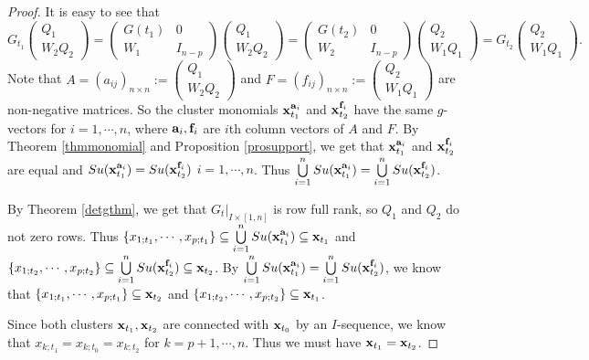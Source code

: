 \documentclass[14pt]{amsart}
\begin{document}
\begin{proof}
It is easy to see that
 $$G_{t_1}\begin{pmatrix}Q_1\\W_2 Q_2\end{pmatrix}=\begin{pmatrix}G(t_1)&0\\ W_1 &I_{n-p}\end{pmatrix} \begin{pmatrix}Q_1\\W_2 Q_2\end{pmatrix}=\begin{pmatrix}G(t_2)&0\\ W_2&I_{n-p}\end{pmatrix} \begin{pmatrix}Q_2\\W_1 Q_1\end{pmatrix} =G_{t_2}\begin{pmatrix}Q_2\\W_1 Q_1\end{pmatrix}.$$
Note that $A=(a_{ij})_{n\times n}:=\begin{pmatrix}Q_1\\W_2 Q_2\end{pmatrix}$ and $F=(f_{ij})_{n\times n}:=\begin{pmatrix}Q_2\\W_1 Q_1\end{pmatrix}$ are non-negative matrices.
So the cluster monomials ${\bf x}_{t_1}^{{\bf a}_i}$ and ${\bf x}_{t_2}^{{\bf f}_i}$ have the same $g$-vectors for $i=1,\cdots,n$, where ${\bf a}_i, {\bf f}_i$ are $i$th column vectors of $A$ and $F$. By Theorem \ref{thmmonomial} and Proposition \ref{prosupport}, we get that ${\bf x}_{t_1}^{{\bf a}_i}$ and ${\bf x}_{t_2}^{{\bf f}_i}$ are equal and $Su({\bf x}_{t_1}^{{\bf a}_i})=Su({\bf x}_{t_2}^{{\bf f}_i})$ $i=1,\cdots,n$. Thus $\bigcup\limits_{i=1}^n Su({\bf x}_{t_1}^{{\bf a}_i})=\bigcup\limits_{i=1}^n Su({\bf x}_{t_2}^{{\bf f}_i})$.

By Theorem \ref{detgthm},  we get that  $G_t|_{I\times [1,n]}$ is row full rank, so $Q_1$ and $Q_2$ do not zero rows. Thus $\{x_{1;t_1},\cdots,x_{p;t_1}\}\subseteq \bigcup\limits_{i=1}^n Su({\bf x}_{t_1}^{{\bf a}_i})\subseteq {\bf x}_{t_1}$ and $\{x_{1;t_2},\cdots,x_{p;t_2}\}\subseteq \bigcup\limits_{i=1}^n Su({\bf x}_{t_2}^{{\bf f}_i})\subseteq {\bf x}_{t_2}$. By $\bigcup\limits_{i=1}^n Su({\bf x}_{t_1}^{{\bf a}_i})=\bigcup\limits_{i=1}^n Su({\bf x}_{t_2}^{{\bf f}_i})$, we know that $\{x_{1;t_1},\cdots,x_{p;t_1}\}\subseteq {\bf x}_{t_2}$ and $\{x_{1;t_2},\cdots,x_{p;t_2}\}\subseteq {\bf x}_{t_1}$.

Since both clusters ${\bf x}_{t_1},{\bf x}_{t_2}$ are connected with ${\bf x}_{t_0}$ by an $I$-sequence, we know that $x_{k;t_1}=x_{k;t_0}=x_{k;t_2}$ for $k=p+1,\cdots,n$. Thus we must have ${\bf x}_{t_1}={\bf x}_{t_2}$.
\end{proof}
\vspace{5mm}
\end{document}
